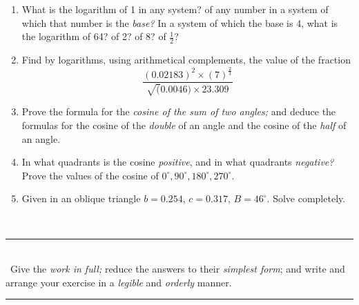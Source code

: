 \documentclass[11pt]{article}
\begin{document}
\begin{enumerate}[resume*=arithmetic, itemindent=-0.2cm]

    \item What is the logarithm of 1 in any system? of any number in a system of which that number is the \textit{base?} In a system of which the base is 4, what is the logarithm of 64? of 2? of 8? of $\frac12$? \vfill

    \item Find by logarithms, using arithmetical complements, the value of the fraction
    \[
    \frac{(0.02183)^2 \times (7)^{\frac23}}{\surd(0.0046) \times 23.309}
    \]
    \vfill

    \item Prove the formula for the \textit{cosine of the sum of two angles;} and deduce the formulas for the cosine of the \textit{double} of an angle and the cosine of the \textit{half} of an angle. \vfill

    \item In what quadrants is the cosine \textit{positive}, and in what quadrants \textit{negative?} Prove the values of the cosine of $0^\circ, 90^\circ, 180^\circ, 270^\circ$. \vfill

    \item Given in an oblique triangle $b=0.254$, $c=0.317$, $B=46^\circ$. Solve completely. \vfill
\end{enumerate}

\newpage

\begin{center}
     \\ \vspace{12pt}
    \rule{2cm}{0.4pt} \\ \vspace{12pt}
    \small{\HandRight\ Give the \textit{work in full;} reduce the answers to their \textit{simplest form}; and write and arrange your exercise in a \textit{legible} and \textit{orderly} manner.} \\
    \rule{2cm}{0.4pt} \\ \vspace{12pt}
\end{center}
\end{document}
